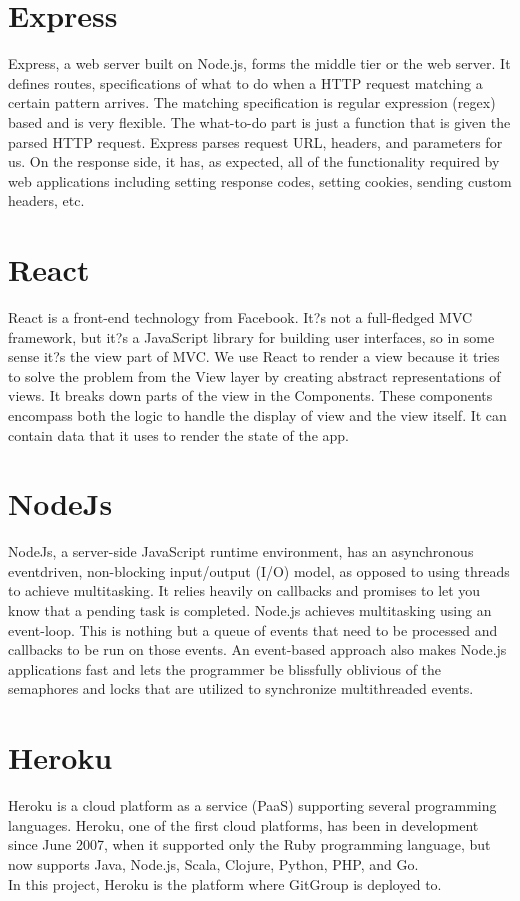\documentclass[12pt,a4paper]{report}
\begin{document}
\section{Express}
Express, a web server built on Node.js, forms the middle tier or the web server. It defines routes, specifications of what to do when a HTTP request matching a certain pattern arrives. The matching specification is regular expression (regex) based and is very flexible. The what-to-do part is just a function that is given the parsed HTTP request. Express parses request URL, headers, and parameters for us. On the response side, it has, as expected, all of the functionality required by web applications including setting response codes, setting cookies, sending custom headers, etc.  
\section{React}
React is a front-end technology from Facebook. It?s not a full-fledged MVC framework, but it?s a JavaScript library for building user interfaces, so in some sense it?s the view part of MVC. We use React to render a view because it tries to solve the problem from the View layer by creating abstract representations of views. It breaks down parts of the view in the Components. These components encompass both the logic to handle the display of view and the view itself. It can contain data that it uses to render the state of the app. 
\section{NodeJs}
NodeJs, a server-side JavaScript runtime environment, has an asynchronous eventdriven, non-blocking input/output (I/O) model, as opposed to using threads to achieve multitasking. It relies heavily on callbacks and promises to let you know that a pending task is completed. Node.js achieves multitasking using an event-loop. This is nothing but a queue of events that need to be processed and callbacks to be run on those events. An event-based approach also makes Node.js applications fast and lets the programmer be blissfully oblivious of the semaphores and locks that are utilized to synchronize multithreaded events.  
\section{Heroku}
Heroku is a cloud platform as a service (PaaS) supporting several programming languages. Heroku, one of the first cloud platforms, has been in development since June 2007, when it supported only the Ruby programming language, but now supports Java, Node.js, Scala, Clojure, Python, PHP, and Go.\\
In this project, Heroku is the platform where GitGroup is deployed to.
\end{document}
